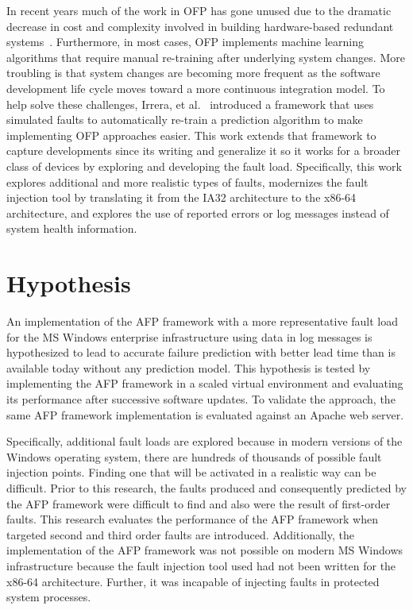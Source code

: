 In recent years much of the work in \ac{OFP} has gone unused due to the
dramatic decrease in cost and complexity involved in building hardware-based
redundant systems~\cite{irrera2015}.  Furthermore, in most cases, \ac{OFP}
implements machine learning algorithms that require manual re-training after
underlying system changes.  More troubling is that system changes are becoming
more frequent as the software development life cycle moves toward a more
continuous integration model.  To help solve these challenges, Irrera, et
al.~\cite{irrera2015} introduced a framework that uses simulated faults to
automatically re-train a prediction algorithm to make implementing \ac{OFP}
approaches easier.  This work extends that framework to capture developments
since its writing and generalize it so it works for a broader class of devices
by exploring and developing the fault load.  Specifically, this work explores
additional and more realistic types of faults, modernizes the fault
injection tool by translating it from the IA32 architecture to the x86-64
architecture, and explores the use of reported errors or log messages instead
of system health information.

\section{Hypothesis}
An implementation of the \ac{AFP} framework with a more representative fault
load for the \ac{MS} Windows enterprise infrastructure using data in log
messages is hypothesized to lead to accurate failure prediction with better
lead time than is available today without any prediction model.  This
hypothesis is tested by implementing the \ac{AFP} framework in a scaled virtual
environment and evaluating its performance after successive software updates.
To validate the approach, the same \ac{AFP} framework implementation is
evaluated against an Apache web server.

Specifically, additional fault loads are explored because in modern versions of
the Windows operating system, there are hundreds of thousands of possible fault
injection points.  Finding one that will be activated in a realistic way can be
difficult.  Prior to this research, the faults produced and consequently
predicted by the \ac{AFP} framework were difficult to find and also were the
result of first-order faults.  This research evaluates the performance of the
\ac{AFP} framework when targeted second and third order faults are introduced.
Additionally, the implementation of the \ac{AFP} framework was not possible on
modern \ac{MS} Windows infrastructure because the fault injection tool used
had not been written for the x86-64 architecture.  Further, it was incapable of
injecting faults in protected system processes.  


